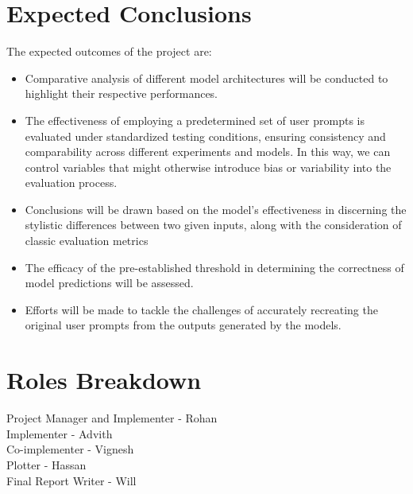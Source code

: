 \documentclass{article}
\begin{document}
\section{Expected Conclusions}
The expected outcomes of the project are:
\begin{itemize}
    \item Comparative analysis of different model architectures will be conducted to highlight their respective performances.
    \item The effectiveness of employing a predetermined set of user prompts is evaluated under standardized testing conditions, ensuring consistency and comparability across different experiments and models. In this way, we can control variables that might otherwise introduce bias or variability into the evaluation process.
    \item Conclusions will be drawn based on the model's effectiveness in discerning the stylistic differences between two given inputs, along with the consideration of classic evaluation metrics 
    \item The efficacy of the pre-established threshold in determining the correctness of model predictions will be assessed. 
    \item Efforts will be made to tackle the challenges of accurately recreating the original user prompts from the outputs generated by the models.




\end{itemize}

\section{Roles Breakdown}
Project Manager and Implementer - Rohan \\
Implementer - Advith \\
Co-implementer - Vignesh \\
Plotter - Hassan \\
Final Report Writer - Will \\



\end{document}
